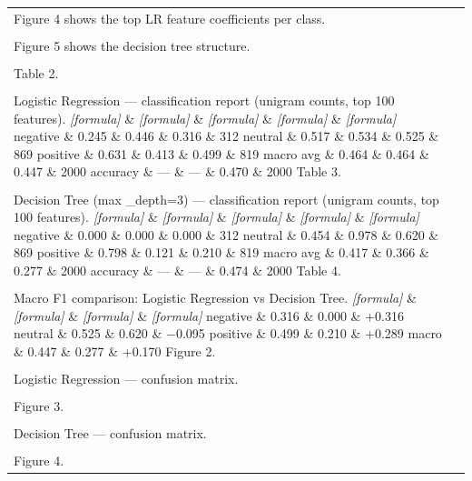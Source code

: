 \documentclass[11pt]{article}
\begin{document}
\begin{longtable}{|p{}|p{}|}
\hline
\rule{0pt}{3.5cm} & \\
\hline
Figure 4 shows the top LR feature coefficients per class. & \\[2pt]
\hline
\rule{0pt}{3.5cm} & \\
\hline
Figure 5 shows the decision tree structure. & \\[2pt]
\hline
\rule{0pt}{3.5cm} & \\
\hline
Table 2. & \\[2pt]
\hline
\rule{0pt}{3.5cm} & \\
\hline
Logistic Regression --- classification report (unigram counts, top 100 features). \textit{[formula]} \& \textit{[formula]} \& \textit{[formula]} \& \textit{[formula]} \& \textit{[formula]} negative \& 0.245 \& 0.446 \& 0.316 \& 312 neutral \& 0.517 \& 0.534 \& 0.525 \& 869 positive \& 0.631 \& 0.413 \& 0.499 \& 819 macro avg \& 0.464 \& 0.464 \& 0.447 \& 2000 accuracy \& --- \& --- \& 0.470 \& 2000 Table 3. & \\[2pt]
\hline
\rule{0pt}{3.5cm} & \\
\hline
Decision Tree (max \_depth=3) --- classification report (unigram counts, top 100 features). \textit{[formula]} \& \textit{[formula]} \& \textit{[formula]} \& \textit{[formula]} \& \textit{[formula]} negative \& 0.000 \& 0.000 \& 0.000 \& 312 neutral \& 0.454 \& 0.978 \& 0.620 \& 869 positive \& 0.798 \& 0.121 \& 0.210 \& 819 macro avg \& 0.417 \& 0.366 \& 0.277 \& 2000 accuracy \& --- \& --- \& 0.474 \& 2000 Table 4. & \\[2pt]
\hline
\rule{0pt}{3.5cm} & \\
\hline
Macro F1 comparison: Logistic Regression vs Decision Tree. \textit{[formula]} \& \textit{[formula]} \& \textit{[formula]} \& \textit{[formula]} negative \& 0.316 \& 0.000 \& +0.316 neutral \& 0.525 \& 0.620 \& −0.095 positive \& 0.499 \& 0.210 \& +0.289 macro \& 0.447 \& 0.277 \& +0.170 Figure 2. & \\[2pt]
\hline
\rule{0pt}{3.5cm} & \\
\hline
Logistic Regression --- confusion matrix. & \\[2pt]
\hline
\rule{0pt}{3.5cm} & \\
\hline
Figure 3. & \\[2pt]
\hline
\rule{0pt}{3.5cm} & \\
\hline
Decision Tree --- confusion matrix. & \\[2pt]
\hline
\rule{0pt}{3.5cm} & \\
\hline
Figure 4. & \\[2pt]

\end{longtable}
\end{document}
